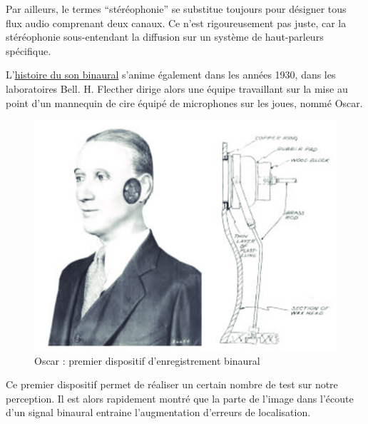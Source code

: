\documentclass[
  letterpaper,
  DIV=11,
  numbers=noendperiod]{scrreprt}
\begin{document}
\begin{tcolorbox}[enhanced jigsaw, leftrule=.75mm, arc=.35mm, bottomtitle=1mm, colback=white, colbacktitle=quarto-callout-note-color!10!white, opacityback=0, left=2mm, rightrule=.15mm, opacitybacktitle=0.6, breakable, toptitle=1mm, titlerule=0mm, bottomrule=.15mm, toprule=.15mm, coltitle=black, title=\textcolor{quarto-callout-note-color}{\faInfo}\hspace{0.5em}{Note}]

Par ailleurs, le termes ``stéréophonie'' se substitue toujours pour
désigner tous flux audio comprenant deux canaux. Ce n'est rigoureusement
pas juste, car la stéréophonie sous-entendant la diffusion sur un
système de haut-parleurs spécifique.

\end{tcolorbox}

L'\href{https://www.researchgate.net/publication/233582452_Binaural_Recording_Technology_A_Historical_Review_and_Possible_Future_Developments}{histoire
du son binaural} s'anime également dans les années 1930, dans les
laboratoires Bell. H. Flecther dirige alors une équipe travaillant sur
la mise au point d'un mannequin de cire équipé de microphones sur les
joues, nommé Oscar.

\begin{figure}

{\centering \includegraphics{spatialisation/../_resources/bitmap/binaural/oscar.png}

}

\caption{Oscar : premier dispositif d'enregistrement binaural}

\end{figure}

Ce premier dispositif permet de réaliser un certain nombre de test sur
notre perception. Il est alors rapidement montré que la parte de l'image
dans l'écoute d'un signal binaural entraine l'augmentation d'erreurs de
localisation.
\end{document}
